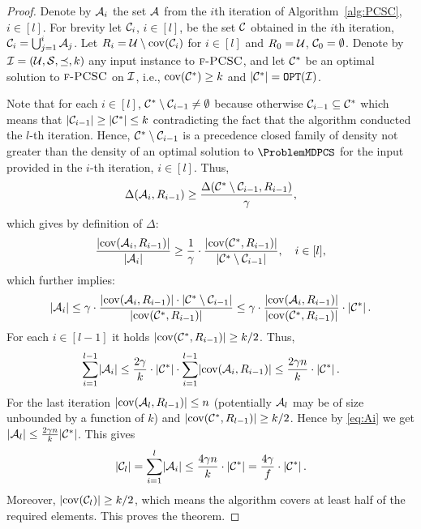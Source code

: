 \begin{proof}
Denote by $\cA_i$ the set $\cA$ from the $i$th iteration of Algorithm~\ref{alg:PCSC}, $i\in[l]$.
For brevity let $\cC_i$, $i\in[l]$, be the set $\cC$ obtained in the $i$th iteration, $\cC_i=\bigcup_{j=1}^i \cA_j$.
Let $R_i=\cU\setminus\cov\br{\cC_i}$ for $i\in[l]$ and $R_0=\cU$, $\cC_0=\emptyset$.
Denote by $\cI=(\cU,\cS,\preceq,k)$ any input instance to $\ProblemPCSC$, and let $\cCopt$ be an optimal solution to $\ProblemPCSC$ on $\cI$, i.e., $\cov\br{\cCopt}\geq k$ and $\spr{\cCopt}=\optPCSC{\cI}$.

Note that for each $i\in[l]$, $\cCopt\setminus\cC_{i-1}\neq\emptyset$ because otherwise $\cC_{i-1}\subseteq\cCopt$ which means that $\spr{\cC_{i-1}}\geq\spr{\cCopt}\leq k$ contradicting the fact that the algorithm conducted the $l$-th iteration.
Hence, $\cCopt\setminus\cC_{i-1}$ is a precedence closed family of density not greater than the density of an optimal solution to $\ProblemMDPCS$ for the input provided in the $i$-th iteration, $i\in[l]$.
Thus, 
\[
\Delta(\cA_i,R_{i-1}) \geq \frac{\Delta(\cCopt\setminus\cC_{i-1},R_{i-1})}{\gamma},
\]
which gives by definition of $\Delta$:
\[
\frac{\spr{\cov\br{\cA_i,R_{i-1}}}}{\spr{\cA_i}} \geq \frac{1}{\gamma}\cdot\frac{\spr{\cov\br{\cCopt,R_{i-1}}}}{\spr{\cCopt\setminus\cC_{i-1}}}, \quad i\in[l],
\]
which further implies:
\begin{equation} \label{eq:Ai}
\spr{\cA_i} \leq \gamma \cdot \frac{ \spr{\cov\br{\cA_i,R_{i-1}}} \cdot \spr{\cCopt\setminus\cC_{i-1}} }{ \spr{\cov\br{\cCopt,R_{i-1}}} }
            \leq \gamma \cdot \frac{ \spr{\cov\br{\cA_i,R_{i-1}}} }{ \spr{\cov\br{\cCopt,R_{i-1}}} } \cdot \spr{\cCopt}.
\end{equation}
For each $i\in[l-1]$ it holds $\spr{\cov\br{\cCopt,R_{i-1}}}\geq k/2$.
Thus,
\[
\sum_{i=1}^{l-1}\spr{\cA_i} \leq \frac{2\gamma}{k} \cdot \spr{\cCopt} \cdot \sum_{i=1}^{l-1}\spr{\cov\br{\cA_i,R_{i-1}}} \leq \frac{2\gamma n}{k} \cdot \spr{\cCopt}.
\]
For the last iteration $\spr{\cov\br{\cA_l,R_{l-1}}}\leq n$ (potentially $\cA_l$ may be of size unbounded by a function of $k$) and $\spr{\cov\br{\cCopt,R_{l-1}}}\geq k/2$.
Hence by \eqref{eq:Ai} we get $\spr{\cA_l}\leq \frac{2\gamma n}{k}\spr{\cCopt}$.
This gives 
\[
\spr{\cC_l}=\sum_{i=1}^l\spr{\cA_i}\leq\frac{4\gamma n}{k}\cdot\spr{\cCopt} = \frac{4\gamma}{f}\cdot\spr{\cCopt}.
\]
Moreover, $\spr{\cov\br{\cC_l}}\geq k/2$, which means the algorithm covers at least half of the required elements.
This proves the theorem.
\end{proof}


